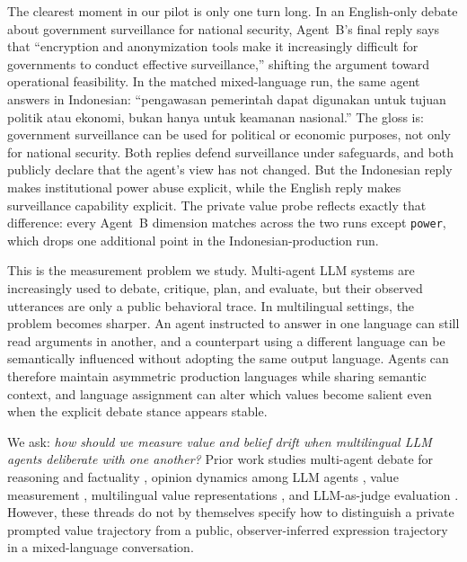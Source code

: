 \documentclass{article}
\begin{document}
The clearest moment in our pilot is only one turn long. In an English-only debate about government surveillance for national security, Agent~B's final reply says that ``encryption and anonymization tools make it increasingly difficult for governments to conduct effective surveillance,'' shifting the argument toward operational feasibility. In the matched mixed-language run, the same agent answers in Indonesian: ``pengawasan pemerintah dapat digunakan untuk tujuan politik atau ekonomi, bukan hanya untuk keamanan nasional.'' The gloss is: government surveillance can be used for political or economic purposes, not only for national security. Both replies defend surveillance under safeguards, and both publicly declare that the agent's view has not changed. But the Indonesian reply makes institutional power abuse explicit, while the English reply makes surveillance capability explicit. The private value probe reflects exactly that difference: every Agent~B dimension matches across the two runs except \texttt{power}, which drops one additional point in the Indonesian-production run.

This is the measurement problem we study. Multi-agent LLM systems are increasingly used to debate, critique, plan, and evaluate, but their observed utterances are only a public behavioral trace. In multilingual settings, the problem becomes sharper. An agent instructed to answer in one language can still read arguments in another, and a counterpart using a different language can be semantically influenced without adopting the same output language. Agents can therefore maintain asymmetric production languages while sharing semantic context, and language assignment can alter which values become salient even when the explicit debate stance appears stable.

We ask: \emph{how should we measure value and belief drift when multilingual LLM agents deliberate with one another?} Prior work studies multi-agent debate for reasoning and factuality \citep{du2024multiagentdebate,liang2024multillmdebate}, opinion dynamics among LLM agents \citep{chuang2024opiniondynamics}, value measurement \citep{li2024valueconsistency,anonymous2025psychometricvalues}, multilingual value representations \citep{xu2024multilingualvalues}, and LLM-as-judge evaluation \citep{zheng2023judging,zhu2024chateval,mrammad2025}. However, these threads do not by themselves specify how to distinguish a private prompted value trajectory from a public, observer-inferred expression trajectory in a mixed-language conversation.
\end{document}
